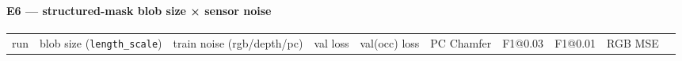 \documentclass[
  10pt,
]{article}
\newcounter{none} %
\begin{document}
\paragraph{E6 --- structured-mask blob size × sensor
noise}\label{e6-structured-mask-blob-size-sensor-noise}

{\def\LTcaptype{none} %
\begin{longtable}[]{@{}
  >{\raggedright\arraybackslash}p{}
  >{\raggedright\arraybackslash}p{}
  >{\raggedright\arraybackslash}p{}
  >{\raggedright\arraybackslash}p{}
  >{\raggedright\arraybackslash}p{}
  >{\raggedright\arraybackslash}p{}
  >{\raggedright\arraybackslash}p{}
  >{\raggedright\arraybackslash}p{}
  >{\raggedright\arraybackslash}p{}
  >{\raggedright\arraybackslash}p{}@{}}
\toprule\noalign{}
\begin{minipage}[b]{\linewidth}\raggedright
run
\end{minipage} & \begin{minipage}[b]{\linewidth}\raggedright
blob size (\texttt{length\_scale})
\end{minipage} & \begin{minipage}[b]{\linewidth}\raggedright
train noise (rgb/depth/pc)
\end{minipage} & \begin{minipage}[b]{\linewidth}\raggedright
val loss
\end{minipage} & \begin{minipage}[b]{\linewidth}\raggedright
val(occ) loss
\end{minipage} & \begin{minipage}[b]{\linewidth}\raggedright
PC Chamfer
\end{minipage} & \begin{minipage}[b]{\linewidth}\raggedright
F1@0.03
\end{minipage} & \begin{minipage}[b]{\linewidth}\raggedright
F1@0.01
\end{minipage} & \begin{minipage}[b]{\linewidth}\raggedright
RGB MSE
\end{minipage} & \begin{minipage}[b]{\linewidth}\raggedright

\end{minipage}
\end{longtable}}
\end{document}
